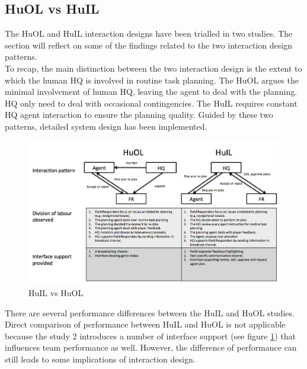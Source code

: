 \subsection{HuOL vs HuIL}
The HuOL and HuIL interaction designs have been trialled in two studies. The section will reflect on some of the findings related to the two interaction design patterns. \\

To recap, the main distinction between the two interaction design is the extent to which the human HQ is involved in routine task planning. The HuOL  argues the minimal involvement of human HQ, leaving the agent to deal with the planning. HQ only need to deal with occasional contingencies. The HuIL requires constant HQ agent interaction to ensure the planning quality. Guided by these two patterns, detailed system design has been implemented.\\

\begin{figure}[h]
  \centering
  \includegraphics[width=1\textwidth]{img/conclusion/huilvshuol}
  \caption{HuIL vs HuOL}
  \label{fig:huilvshuol}
\end{figure}


There are several performance differences between the HuIL and HuOL studies. Direct comparison of performance between HuIL and HuOL is not applicable because the study 2 introduces a number of interface support (see figure \ref{fig:huilvshuol}) that influences team performance as well. However, the difference of performance can still leads to some implications of interaction design.\\

